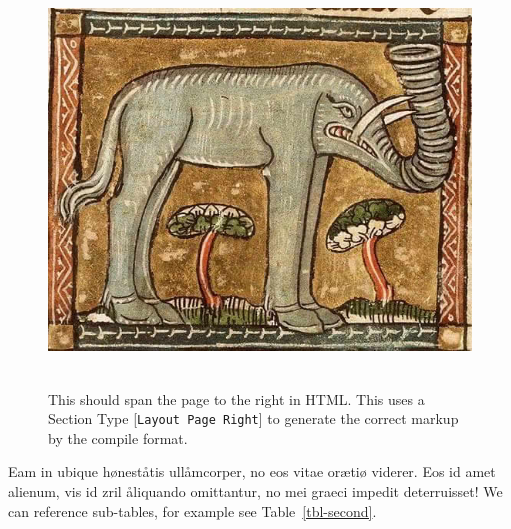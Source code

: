 \documentclass[
  12pt,
  a4paper,
  oneside,
  titlepage,
  toclink=all,
  toc=bibliography]{scrbook}
\theoremstyle{plain}
\theoremstyle{plain}
\theoremstyle{definition}
\theoremstyle{definition}
\theoremstyle{plain}
\theoremstyle{plain}
\theoremstyle{plain}
\theoremstyle{definition}
\theoremstyle{remark}
\begin{document}
\begin{figure}

{\centering \includegraphics[width=5.27083in,height=4.28125in]{Elephant3.jpg}

}

\caption{\label{fig-scriv167}This should span the page to the right in
HTML. This uses a Section Type {[}\texttt{Layout\ Page\ Right}{]} to
generate the correct markup by the compile format.}

\end{figure}

Eam in ubique høneståtis ullåmcorper, no eos vitae orætiø viderer. Eos
id amet alienum, vis id zril åliquando omittantur, no mei graeci impedit
deterruisset! We can reference sub-tables, for example see
\protect\hypertarget{cite_29}{}{\label{cite_29}Table~\ref{tbl-second}}.
\end{document}
